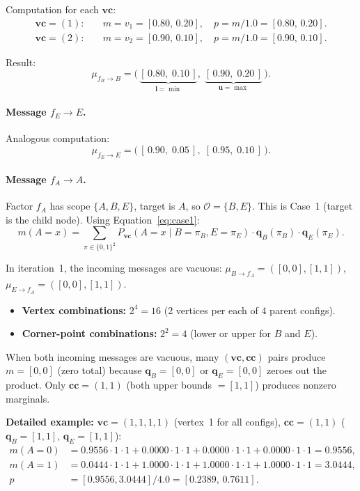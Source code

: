 \documentclass[11pt]{article}
\begin{document}
Computation for each $\mathbf{vc}$:
\begin{align*}
  \mathbf{vc} = (1): \quad & m = v_1 = [0.80,\, 0.20], \quad
  p = m / 1.0 = [0.80,\, 0.20]. \\
  \mathbf{vc} = (2): \quad & m = v_2 = [0.90,\, 0.10], \quad
  p = m / 1.0 = [0.90,\, 0.10].
\end{align*}

Result:
\[
  \mu_{f_B \to B} = \bigl(\,\underbrace{[\,0.80,\; 0.10\,]}_{\mathbf{l} = \min},\;
  \underbrace{[\,0.90,\; 0.20\,]}_{\mathbf{u} = \max}\,\bigr).
\]

\paragraph{Message $f_E \to E$.} Analogous computation:
\[
  \mu_{f_E \to E} = \bigl(\,[\,0.90,\; 0.05\,],\; [\,0.95,\; 0.10\,]\,\bigr).
\]

\paragraph{Message $f_A \to A$.}
Factor $f_A$ has scope $\{A, B, E\}$, target is $A$, so $\mathcal{O} = \{B, E\}$.
This is Case~1 (target is the child node). Using Equation~\ref{eq:case1}:
\[
  m(A{=}x) = \sum_{\pi \in \{0,1\}^2} P_{\mathbf{vc}}(A{=}x \mid B{=}\pi_B, E{=}\pi_E)
  \cdot \mathbf{q}_B(\pi_B) \cdot \mathbf{q}_E(\pi_E).
\]

In iteration~1, the incoming messages are vacuous: $\mu_{B \to f_A} = ([0,0],[1,1])$,
$\mu_{E \to f_A} = ([0,0],[1,1])$.

\begin{itemize}
\item \textbf{Vertex combinations:} $2^4 = 16$ (2 vertices per each of 4 parent configs).
\item \textbf{Corner-point combinations:} $2^2 = 4$ (lower or upper for $B$ and $E$).
\end{itemize}

When both incoming messages are vacuous, many $(\mathbf{vc}, \mathbf{cc})$ pairs
produce $m = [0, 0]$ (zero total) because $\mathbf{q}_B = [0,0]$ or
$\mathbf{q}_E = [0,0]$ zeroes out the product.
Only $\mathbf{cc} = (1,1)$ (both upper bounds $=[1,1]$) produces nonzero marginals.

\textbf{Detailed example:} $\mathbf{vc} = (1,1,1,1)$ (vertex~1 for all configs),
$\mathbf{cc} = (1,1)$ ($\mathbf{q}_B = [1,1]$, $\mathbf{q}_E = [1,1]$):
\begin{align*}
  m(A{=}0) &= 0.9556 \cdot 1 \cdot 1 + 0.0000 \cdot 1 \cdot 1
              + 0.0000 \cdot 1 \cdot 1 + 0.0000 \cdot 1 \cdot 1 = 0.9556, \\
  m(A{=}1) &= 0.0444 \cdot 1 \cdot 1 + 1.0000 \cdot 1 \cdot 1
              + 1.0000 \cdot 1 \cdot 1 + 1.0000 \cdot 1 \cdot 1 = 3.0444, \\
  p &= [0.9556, 3.0444] / 4.0 = [0.2389,\, 0.7611].
\end{align*}
\end{document}
